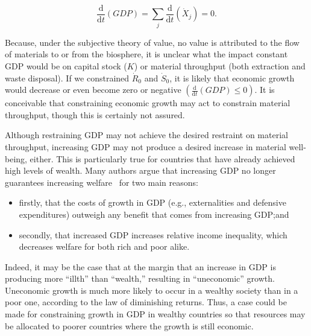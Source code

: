 \begin{equation}\label{eq:const_GDP}
	\frac{\mathrm{d}}{\mathrm{d}t}\left(GDP\right)
	=	\sum\limits_{j}\frac{\mathrm{d}}{\mathrm{d}t}\left(\dot{X}_{j}\right)
	= 0.
\end{equation}

Because,
under the subjective theory of value,
no value is attributed to the flow of materials
to or from the biosphere,
it is unclear what the impact constant GDP would be
on capital stock ($K$)
or material throughput
(both extraction and waste disposal).
If we constrained $\dot{R}_{0}$ and
$\dot{S}_{0}$, 
it is likely that economic growth would 
decrease or even become zero or negative
$\left(\frac{\mathrm{d}}{\mathrm{d}t}\left(GDP\right) \leq 0\right)$.
It is conceivable that constraining
economic growth may act to constrain
material throughput,
though this is certainly not assured.

Although restraining GDP may not achieve the desired restraint on material throughput,
increasing GDP may not produce a desired increase 
in material well-being, either. 
This is particularly 
true for countries that have already achieved high levels of wealth.  
Many authors argue that increasing GDP
no longer guarantees increasing welfare~\cite{G-R1975a, Wackernagel1996,
Cobb1999, Daly2006, Costanza2014} 
for two main reasons:
\begin{itemize}
	\item firstly, that the costs of growth in GDP (e.g., externalities 
           and defensive expenditures) outweigh any benefit 
	that comes from increasing GDP;\@ and
	
	\item secondly, that increased GDP 
	increases relative income inequality,
	which decreases welfare for both rich and poor 
	alike.\cite{Daly2006}
\end{itemize}

Indeed, it may be the case that at the margin that an increase 
in GDP is producing more ``illth'' than ``wealth,'' 
resulting
in ``uneconomic'' growth.~\cite[p. 42]{Daly2006} 
Uneconomic growth is much more likely 
to occur in a wealthy society than in a poor one, 
according to the law of diminishing returns. 
Thus, a case could be made for constraining growth in GDP in wealthy countries 
so that resources may be allocated to poorer countries
where the growth is still economic.~\cite{Daly2006}


